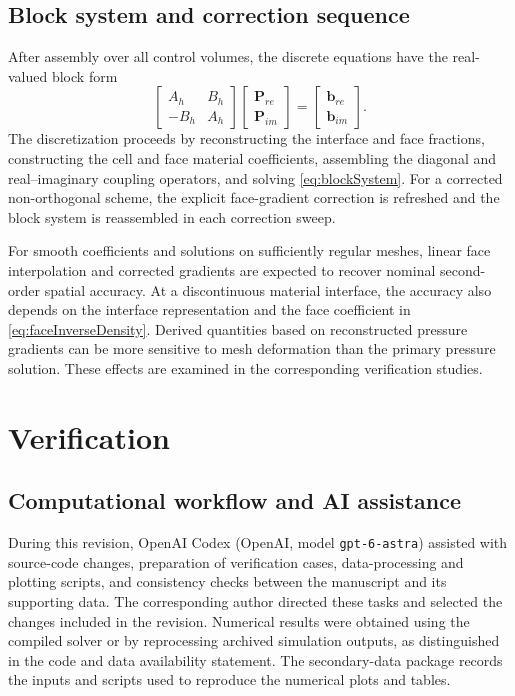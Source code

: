 \documentclass[final,12pt,nopreprintline,longtitle]{elsarticle}
\begin{document}
\subsection{Block system and correction sequence}

After assembly over all control volumes, the discrete equations have the
real-valued block form
\begin{equation}
\begin{bmatrix}
    A_h & B_h\\
    -B_h & A_h
\end{bmatrix}
\begin{bmatrix}
    \mathbf{P}_{re}\\
    \mathbf{P}_{im}
\end{bmatrix}
=
\begin{bmatrix}
    \mathbf{b}_{re}\\
    \mathbf{b}_{im}
\end{bmatrix}.
\label{eq:blockSystem}
\end{equation}
The discretization proceeds by reconstructing the interface and face fractions,
constructing the cell and face material coefficients, assembling the diagonal
and real--imaginary coupling operators, and solving \cref{eq:blockSystem}.
For a corrected non-orthogonal scheme, the explicit face-gradient correction
is refreshed and the block system is reassembled in each correction sweep.

For smooth coefficients and solutions on sufficiently regular meshes, linear
face interpolation and corrected gradients are expected to recover nominal
second-order spatial accuracy.  At a discontinuous material interface, the
accuracy also depends on the interface representation and the face coefficient
in \cref{eq:faceInverseDensity}.  Derived quantities based on reconstructed
pressure gradients can be more sensitive to mesh deformation than the primary
pressure solution.  These effects are examined in the corresponding
verification studies.

\section{Verification}
\label{sec:verification}

\subsection{Computational workflow and AI assistance}
\label{sec:aiWorkflow}

During this revision, OpenAI Codex (OpenAI, model
\texttt{gpt-6-astra}) assisted with source-code changes, preparation of
verification cases, data-processing and plotting scripts, and consistency
checks between the manuscript and its supporting data.  The corresponding
author directed these tasks and selected the changes included in the
revision.  Numerical results were obtained using the compiled solver or by
reprocessing archived simulation outputs, as distinguished in the code and
data availability statement.  The secondary-data package records the
inputs and scripts used to reproduce the numerical plots and tables.
\end{document}
